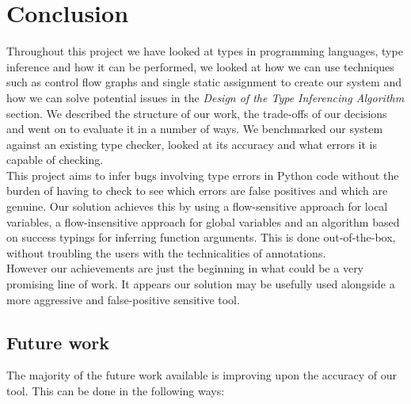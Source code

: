 \documentclass[12pt, titlepage]{article}
\begin{document}
\section{Conclusion}
Throughout this project we have looked at types in programming languages, type inference and how it can be performed, we looked at how we can use techniques such as control flow graphs and single static assignment to create our system and how we can solve potential issues in the \textit{Design of the Type Inferencing Algorithm} section. We described the structure of our work, the trade-offs of our decisions and went on to evaluate it in a number of ways. We benchmarked our system against an existing type checker, looked at its accuracy and what errors it is capable of checking. \\
\indent This project aims to infer bugs involving type errors in Python code without the burden of having to check to see which errors are false positives and which are genuine. Our solution achieves this by using a flow-sensitive approach for local variables, a flow-insensitive approach for global variables and an algorithm based on success typings for inferring function arguments. This is done out-of-the-box, without troubling the users with the technicalities of annotations. \\
\indent However our achievements are just the beginning in what could be a very promising line of work. It appears our solution may be usefully used alongside a more aggressive and false-positive sensitive tool.

\subsection{Future work}
The majority of the future work available is improving upon the accuracy of our tool. This can be done in the following ways:
\end{document}
